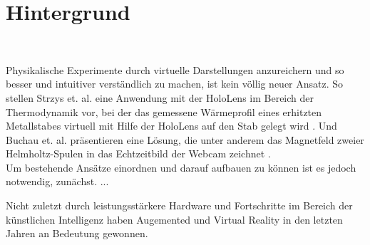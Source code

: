 \section{Hintergrund}
\label{sec-2}
\begin{center}
	\\
\end{center}


Physikalische Experimente durch virtuelle Darstellungen anzureichern und so besser und intuitiver verständlich zu machen, ist kein völlig neuer Ansatz. So stellen Strzys et. al. eine Anwendung mit der HoloLens im Bereich der Thermodynamik vor, bei der das gemessene Wärmeprofil eines erhitzten Metallstabes virtuell mit Hilfe der HoloLens auf den Stab gelegt wird \cite{Strzys17}. Und Buchau et. al. präsentieren eine Lösung, die unter anderem das Magnetfeld zweier Helmholtz-Spulen in das Echtzeitbild der Webcam zeichnet \cite{Buchau09}.\\

Um bestehende Ansätze einordnen und darauf aufbauen zu können ist es jedoch notwendig, zunächst. ...


Nicht zuletzt durch leistungsstärkere Hardware und Fortschritte im Bereich der künstlichen Intelligenz haben Augemented und Virtual Reality in den letzten Jahren an Bedeutung gewonnen. 